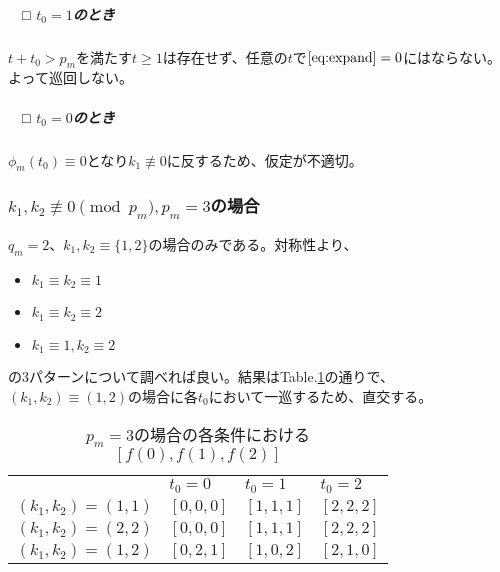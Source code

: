\documentclass[platex]{jsarticle}
\newcommand{\ssubparagraph}[1]{\subparagraph{$\quad$□ #1}}
\begin{document}
\ssubparagraph{$t_0 = 1$のとき}
$t+t_0>p_m$を満たす$t\geq 1$は存在せず、任意の$t$で$\eqref{eq:expand}=0$にはならない。よって巡回しない。

\ssubparagraph{$t_0 = 0$のとき}
$\phi_m(t_0)\equiv 0$となり$k_1 \not\equiv 0$に反するため、仮定が不適切。

\subsubsection{$k_1,k_2 \not\equiv 0 \pmod{p_m}, p_m = 3$の場合}
$q_m=2$、$k_1,k_2 \equiv \{1,2\}$の場合のみである。対称性より、
\begin{itemize}
    \item $k_1\equiv k_2 \equiv 1$
    \item $k_1\equiv k_2 \equiv 2$
    \item $k_1 \equiv 1, k_2 \equiv 2$
\end{itemize}
の3パターンについて調べれば良い。結果はTable.\ref{tab:p3}の通りで、$(k_1, k_2) \equiv (1, 2)$の場合に各$t_0$において一巡するため、直交する。

\begin{table}[h]
\centering
\begin{tabular}{llll}
                      & $t_0 = 0$ & $t_0 = 1$ & $t_0 = 2$ \\
$(k_1, k_2) = (1, 1)$ & $[0,0,0]$ & $[1,1,1]$ & $[2,2,2]$ \\
$(k_1, k_2) = (2, 2)$ & $[0,0,0]$ & $[1,1,1]$ & $[2,2,2]$ \\
$(k_1, k_2) = (1, 2)$ & $[0,2,1]$ & $[1,0,2]$ & $[2,1,0]$
\end{tabular}
\caption{$p_m=3$の場合の各条件における$[f(0),f(1),f(2)]$}
\label{tab:p3}
\end{table}
\end{document}

